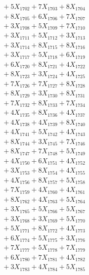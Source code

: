 \documentclass[a4paper,10pt]{article}
\begin{document}
{\begin{align}
&\;  + 5 X_{1702} + 7 X_{1703} + 8 X_{1704} \\[0.3ex]
&\;  + 8 X_{1705} + 6 X_{1706} + 7 X_{1707} \\[0.3ex]
&\;  + 3 X_{1708} + 5 X_{1709} + 7 X_{1710} \\[0.3ex]
&\;  + 3 X_{1711} + 5 X_{1712} + 3 X_{1713} \\[0.3ex]
&\;  + 3 X_{1714} + 8 X_{1715} + 8 X_{1716} \\[0.3ex]
&\;  + 3 X_{1717} + 5 X_{1718} + 6 X_{1719} \\[0.5ex]\allowbreak
&\;  + 6 X_{1720} + 8 X_{1721} + 4 X_{1722} \\[0.3ex]
&\;  + 8 X_{1723} + 3 X_{1724} + 4 X_{1725} \\[0.3ex]
&\;  + 7 X_{1726} + 7 X_{1727} + 8 X_{1728} \\[0.3ex]
&\;  + 8 X_{1729} + 3 X_{1730} + 8 X_{1731} \\[0.3ex]
&\;  + 7 X_{1732} + 8 X_{1733} + 7 X_{1734} \\[0.3ex]
&\;  + 4 X_{1735} + 8 X_{1736} + 4 X_{1737} \\[0.3ex]
&\;  + 4 X_{1738} + 4 X_{1739} + 8 X_{1740} \\[0.3ex]
&\;  + 4 X_{1741} + 5 X_{1742} + 4 X_{1743} \\[0.3ex]
&\;  + 8 X_{1744} + 3 X_{1745} + 7 X_{1746} \\[0.3ex]
&\;  + 8 X_{1747} + 7 X_{1748} + 5 X_{1749} \\[0.5ex]\allowbreak
&\;  + 4 X_{1750} + 6 X_{1751} + 4 X_{1752} \\[0.3ex]
&\;  + 3 X_{1753} + 8 X_{1754} + 4 X_{1755} \\[0.3ex]
&\;  + 4 X_{1756} + 8 X_{1757} + 5 X_{1758} \\[0.3ex]
&\;  + 7 X_{1759} + 4 X_{1760} + 4 X_{1761} \\[0.3ex]
&\;  + 8 X_{1762} + 4 X_{1763} + 5 X_{1764} \\[0.3ex]
&\;  + 3 X_{1765} + 5 X_{1766} + 5 X_{1767} \\[0.3ex]
&\;  + 3 X_{1768} + 3 X_{1769} + 5 X_{1770} \\[0.3ex]
&\;  + 5 X_{1771} + 8 X_{1772} + 4 X_{1773} \\[0.3ex]
&\;  + 6 X_{1774} + 5 X_{1775} + 3 X_{1776} \\[0.3ex]
&\;  + 7 X_{1777} + 5 X_{1778} + 7 X_{1779} \\[0.5ex]\allowbreak
&\;  + 6 X_{1780} + 7 X_{1781} + 4 X_{1782} \\[0.3ex]
&\;  + 3 X_{1783} + 4 X_{1784} + 5 X_{1785} \\[0.3ex]

\end{align}}
\end{document}
